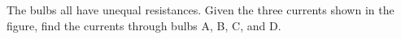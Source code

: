 The bulbs all have unequal resistances. Given the three
currents shown in the figure, find the currents through
bulbs A, B, C, and D.\answercheck
